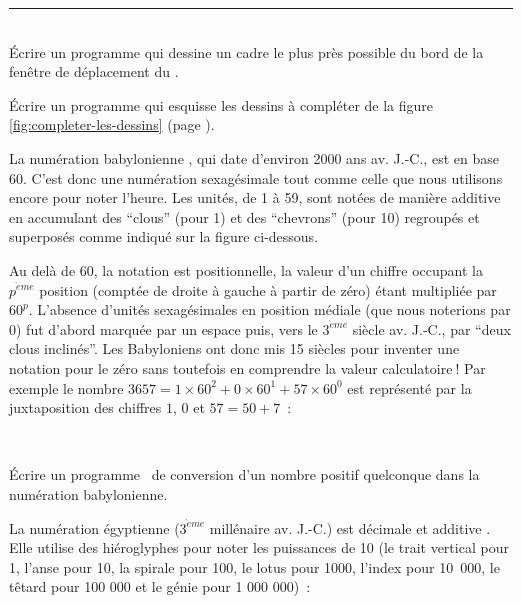 \vfill

\noindent \rule{137mm}{0.1mm} %

\noindent\begin{exercices}{\ \\

\tiret Écrire un programme qui dessine un cadre le plus près possible du bord de la fenêtre de déplacement
du \robot.

\tiret Écrire un programme qui esquisse les dessins à  compléter de la figure \ref{fig:completer-les-dessins} 
(page \pageref{fig:completer-les-dessins}).

\tiret La numération babylonienne \cite{guitel}, qui date d'environ 2000 ans av. J.-C., est en
base 60. C'est donc une numération sexagésimale tout comme celle que nous utilisons encore
pour noter l'heure. Les unités, de 1 à 59, sont notées de manière additive en accumulant des ``clous'' (pour
1) et des ``chevrons'' (pour 10) regroupés et superposés comme indiqué sur la figure
ci-dessous.\\[3.9cm]
\noindent{}%

\noindent Au delà de 60, la notation est positionnelle, la valeur d'un chiffre occupant
la $p^{\grave{e}me}$ position (comptée de droite à gauche à partir de zéro) étant
multipliée par $60^{p}$. L'absence d'unités sexagésimales en position médiale (que
nous no\-te\-rions par 0) fut d'abord marquée par un espace puis, vers le $3^{\grave{e}me}$
siècle av. J.-C., par ``deux clous inclinés''. Les Babyloniens ont donc mis 15 siècles pour
inventer une notation pour le
zéro sans toutefois en comprendre la valeur calculatoire$\:$! Par exemple 
le nombre $3657 = 1 \times 60^{2} + 0 \times 60^{1} + 57 \times 60^{0}$
est représenté par la juxtaposition des chiffres $1$, $0$ et 
$57 = 50 + 7$~:

\pagebreak
\mbox{}\\[1.9cm]
\noindent{}%

Écrire un programme \pascal\ de conversion
d'un nombre po\-si\-tif quel\-con\-que dans la nu\-mé\-ra\-tion babylonienne. 

\tiret La numération égyptienne ($3^{\grave{e}me}$ 
millénaire av. J.-C.) est décimale et additive \cite{guitel}. Elle utilise des hiéroglyphes pour 
noter les
puissances de 10 (le trait vertical pour 1, l'anse pour 10, la spirale pour 100, le lotus pour 1000,
l'index pour 10~000,
le têtard pour 100 000 et le génie pour 1 000 000)~:\\[3.0cm]

}
\end{exercices}
